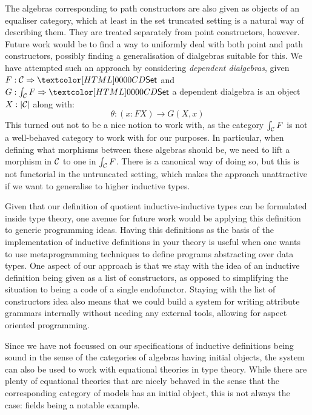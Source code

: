 The algebras corresponding to path constructors are also given as
objects of an equaliser category, which at least in the set truncated
setting is a natural way of describing them. They are treated
separately from point constructors, however. Future work would be to
find a way to uniformly deal with both point and path constructors,
possibly finding a generalisation of dialgebras suitable for this. We
have attempted such an approach by considering \emph{dependent
  dialgebras}, \ie given $F : \Func{\Cc}{\Set}$ and
$G : \Func{\int_{\Cc} F}{\Set}$ a dependent dialgebra is an object
$X : | \mathcal{C} |$ along with:
$$
\theta : (x : FX) \to G (X , x)
$$
This turned out not to be a nice notion to work with, as the category
$\int_{\mathcal{C}} F$ is not a well-behaved category to work with for our
purposes. In particular, when defining what morphisms between these
algebras should be, we need to lift a morphism in $\mathcal{C}$ to one in
$\int_{\mathcal{C}} F$. There is a canonical way of doing so, but this is not
functorial in the untruncated setting, which makes the approach
unattractive if we want to generalise to higher inductive types.

Given that our definition of quotient inductive-inductive types can be
formulated inside type theory, one avenue for future work would be
applying this definition to generic programming ideas. Having this
definitions as the basis of the implementation of inductive
definitions in your theory is useful when one wants to use
metaprogramming techniques to define programs abstracting over data
types. One aspect of our approach is that we stay with the idea of an
inductive definition being given as a list of constructors, as opposed
to simplifying the situation to being a code of a single
endofunctor. Staying with the list of constructors idea also means
that we could build a system for writing attribute grammars internally
without needing any external tools, allowing for aspect oriented
programming.

Since we have not focussed on our specifications of inductive
definitions being sound in the sense of the categories of algebras
having initial objects, the system can also be used to work with
equational theories in type theory. While there are plenty of
equational theories that are nicely behaved in the sense that the
corresponding category of models has an initial object, this is not
always the case: fields being a notable example.


